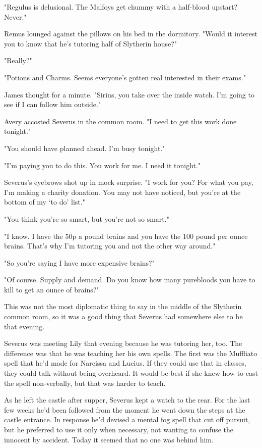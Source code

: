 \documentclass[a4paper,11pt]{article}
\begin{document}
"Regulus is delusional. The Malfoys get chummy with a half-blood upstart? Never."

Remus lounged against the pillows on his bed in the dormitory. "Would it interest you to know that he's tutoring half of Slytherin house?"

"Really?"

"Potions and Charms. Seems everyone's gotten real interested in their exams."

James thought for a minute. "Sirius, you take over the inside watch. I'm going to see if I can follow him outside."

Avery accosted Severus in the common room. "I need to get this work done tonight."

"You should have planned ahead. I'm busy tonight."

"I'm paying you to do this. You work for me. I need it tonight."

Severus's eyebrows shot up in mock surprise. "I work for you? For what you pay, I'm making a charity donation. You may not have noticed, but you're at the bottom of my `to do' list."

"You think you're so smart, but you're not so smart."

"I know. I have the 50p a pound brains and you have the 100 pound per ounce brains. That's why I'm tutoring you and not the other way around."

"So you're saying I have more expensive brains?"

"Of course. Supply and demand. Do you know how many purebloods you have to kill to get an ounce of brains?"

This was not the most diplomatic thing to say in the middle of the Slytherin common room, so it was a good thing that Severus had somewhere else to be that evening.

Severus was meeting Lily that evening because he was tutoring her, too. The difference was that he was teaching her his own spells. The first was the Muffliato spell that he'd made for Narcissa and Lucius. If they could use that in classes, they could talk without being overheard. It would be best if she knew how to cast the spell non-verbally, but that was harder to teach.

As he left the castle after supper, Severus kept a watch to the rear. For the last few weeks he'd been followed from the moment he went down the steps at the castle entrance. In response he'd devised a mental fog spell that cut off pursuit, but he preferred to use it only when necessary, not wanting to confuse the innocent by accident. Today it seemed that no one was behind him.
\end{document}
